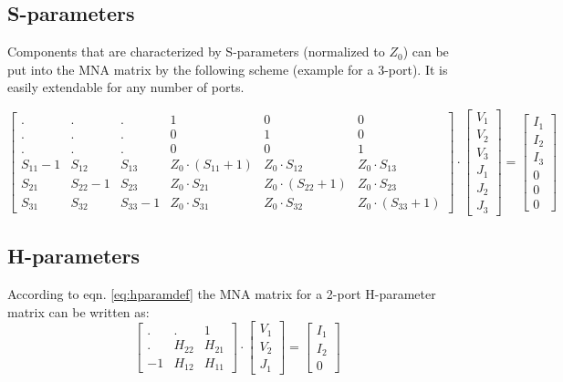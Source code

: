 \subsection{S-parameters}

Components that are characterized by S-parameters (normalized to
$Z_0$) can be put into the MNA matrix by the following scheme (example
for a 3-port). It is easily extendable for any number of ports.

\begin{equation}
\label{eqn:Sparam2mna}
\begin{bmatrix}
 . & . & .  &  1 & 0 & 0\\
 . & . & .  &  0 & 1 & 0\\
 . & . & .  &  0 & 0 & 1\\
S_{11}-1 &  S_{12} & S_{13} & Z_0\cdot (S_{11}+1) & Z_0\cdot S_{12} & Z_0\cdot S_{13}\\
S_{21} &  S_{22}-1 & S_{23} & Z_0\cdot S_{21} & Z_0\cdot (S_{22}+1) & Z_0\cdot S_{23}\\
S_{31} &  S_{32} & S_{33}-1 & Z_0\cdot S_{31} & Z_0\cdot S_{32} & Z_0\cdot (S_{33}+1)
\end{bmatrix}
\cdot
\begin{bmatrix}
V_{1}\\
V_{2}\\
V_{3}\\
J_{1}\\
J_{2}\\
J_{3}
\end{bmatrix}
=
\begin{bmatrix}
I_{1}\\
I_{2}\\
I_{3}\\
0\\
0\\
0
\end{bmatrix}
\end{equation}

\subsection{H-parameters}

According to eqn. \eqref{eq:hparamdef} the MNA matrix for a 2-port
H-parameter matrix can be written as:
\begin{equation}
\begin{bmatrix}
 . & .  &  1 \\
 . & H_{22} & H_{21} \\
-1 & H_{12} & H_{11}
\end{bmatrix}
\cdot
\begin{bmatrix}
V_{1}\\
V_{2}\\
J_{1}
\end{bmatrix}
=
\begin{bmatrix}
I_{1}\\
I_{2}\\
0
\end{bmatrix}
\end{equation}

